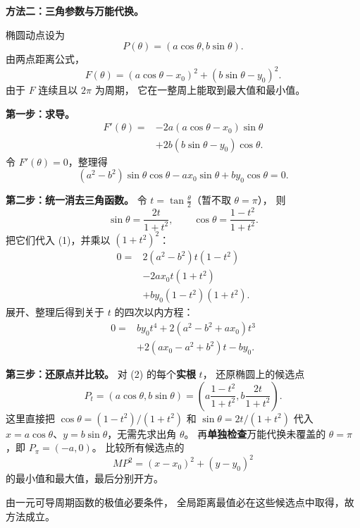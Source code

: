 \begin{proofbox}
	\textbf{方法二：三角参数与万能代换。}

	椭圆动点设为
	\[
		P(\theta)=(a\cos\theta,b\sin\theta).
	\]
	由两点距离公式，
	\[
		F(\theta)=(a\cos\theta-x_0)^2
		+(b\sin\theta-y_0)^2.
	\]
	由于 $F$ 连续且以 $2\pi$ 为周期，
	它在一整周上能取到最大值和最小值。

	\textbf{第一步：求导。}
	\[
		\begin{aligned}
			F'(\theta)
			={} & -2a(a\cos\theta-x_0)\sin\theta  \\
			    & +2b(b\sin\theta-y_0)\cos\theta.
		\end{aligned}
	\]
	令 $F'(\theta)=0$，整理得
	\[
		(a^2-b^2)\sin\theta\cos\theta
		-ax_0\sin\theta+by_0\cos\theta=0.\tag{1}
	\]

	\textbf{第二步：统一消去三角函数。}
	令 $t=\tan\frac{\theta}{2}$（暂不取 $\theta=\pi$），
	则
	\[
		\sin\theta=\frac{2t}{1+t^2},\qquad
		\cos\theta=\frac{1-t^2}{1+t^2}.
	\]
	把它们代入 (1)，并乘以 $(1+t^2)^2$：
	\[
		\begin{aligned}
			0={} & 2(a^2-b^2)t(1-t^2)   \\
			     & -2ax_0t(1+t^2)       \\
			     & +by_0(1-t^2)(1+t^2).
		\end{aligned}
	\]
	展开、整理后得到关于 $t$ 的四次以内方程：
	\[
		\boxed{\begin{aligned}
				0={} & by_0t^4+2(a^2-b^2+ax_0)t^3 \\
				     & +2(ax_0-a^2+b^2)t-by_0.
			\end{aligned}}
		\tag{2}
	\]

	\textbf{第三步：还原点并比较。}
	对 (2) 的每个\textbf{实根} $t$，
	还原椭圆上的候选点
	\[
		P_t=(a\cos\theta,b\sin\theta)=\left(a\frac{1-t^2}{1+t^2},
		b\frac{2t}{1+t^2}\right).
	\]
	这里直接把 $\cos\theta=(1-t^2)/(1+t^2)$ 和 $\sin\theta=2t/(1+t^2)$ 代入 $x=a\cos\theta$、$y=b\sin\theta$，无需先求出角 $\theta$。
	再\textbf{单独检查}万能代换未覆盖的
	$\theta=\pi$，即 $P_\pi=(-a,0)$。
	比较所有候选点的
	\[
		MP^2=(x-x_0)^2+(y-y_0)^2
	\]
	的最小值和最大值，最后分别开方。

	由一元可导周期函数的极值必要条件，
	全局距离最值必在这些候选点中取得，故方法成立。
\end{proofbox}
